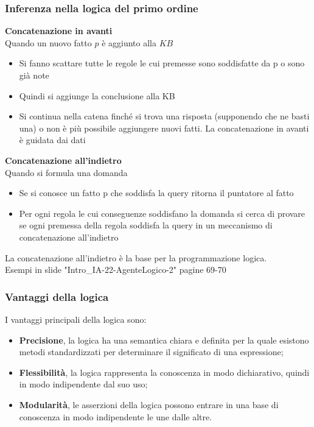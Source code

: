 \documentclass[../main.tex]{subfiles}
\begin{document}
	\subsubsection{Inferenza nella logica del primo ordine}
	\textbf{Concatenazione in avanti} \\
	Quando un nuovo fatto $p$ è aggiunto alla $KB$
	\begin{itemize}
		\item Si fanno scattare tutte le regole le cui premesse sono soddisfatte da p o sono già note
		\item Quindi si aggiunge la conclusione alla KB
		\item Si continua nella catena finché si trova una risposta (supponendo che ne basti una) o non è più possibile aggiungere nuovi fatti. La concatenazione in avanti è guidata dai dati
	\end{itemize}
	\textbf{Concatenazione all'indietro} \\
	Quando si formula una domanda
	\begin{itemize}
		\item Se si conosce un fatto p che soddisfa la query ritorna il puntatore al fatto
		\item Per ogni regola le cui conseguenze soddisfano la domanda si cerca di provare se ogni premessa della regola soddisfa la query in un meccanismo di concatenazione all'indietro
	\end{itemize}
	La concatenazione all’indietro è la base per la programmazione logica.\\
	{\color{red} Esempi in slide "Intro\_IA-22-AgenteLogico-2" pagine 69-70}
	\subsubsection{Vantaggi della logica}
	I vantaggi principali della logica sono:
	\begin{itemize}
		\item \textbf{Precisione}, la logica ha una semantica chiara e definita per la quale esistono metodi standardizzati per determinare il significato di una espressione;
		\item \textbf{Flessibilità}, la logica rappresenta la conoscenza in modo dichiarativo, quindi in modo indipendente dal suo uso;
		\item \textbf{Modularità}, le asserzioni della logica possono entrare in una base di conoscenza in modo indipendente le une dalle altre.
	\end{itemize}
\end{document}
